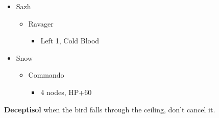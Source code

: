 \begin{multicols}{2}
\begin{menu}
\begin{itemize}
    \crystarium
    \begin{itemize}
        \item Sazh
        \begin{itemize}
            \item Ravager
            \begin{itemize}
                \item Left 1, Cold Blood
            \end{itemize}
        \end{itemize}
        \item Snow
        \begin{itemize}
            \item Commando
            \begin{itemize}
                \item 4 nodes, HP+60
            \end{itemize}
        \end{itemize}
    \end{itemize}
\end{itemize}
\end{menu}
\textbf{Deceptisol} when the bird falls through the ceiling, don't cancel it.


\end{multicols}
